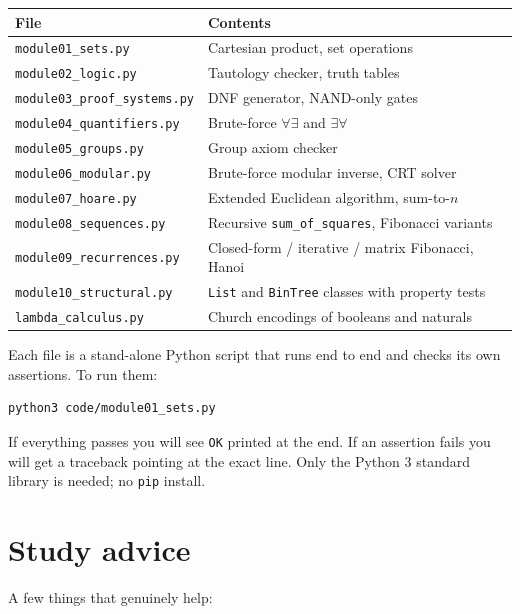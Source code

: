 \documentclass[11pt]{article}
\begin{document}
\begin{center}
\begin{tabular}{l l}
\toprule
\textbf{File} & \textbf{Contents} \\
\midrule
\texttt{module01\_sets.py}           & Cartesian product, set operations \\
\texttt{module02\_logic.py}          & Tautology checker, truth tables \\
\texttt{module03\_proof\_systems.py} & DNF generator, NAND-only gates \\
\texttt{module04\_quantifiers.py}    & Brute-force $\forall\exists$ and $\exists\forall$ \\
\texttt{module05\_groups.py}         & Group axiom checker \\
\texttt{module06\_modular.py}        & Brute-force modular inverse, CRT solver \\
\texttt{module07\_hoare.py}          & Extended Euclidean algorithm, sum-to-$n$ \\
\texttt{module08\_sequences.py}      & Recursive \texttt{sum\_of\_squares}, Fibonacci variants \\
\texttt{module09\_recurrences.py}    & Closed-form / iterative / matrix Fibonacci, Hanoi \\
\texttt{module10\_structural.py}     & \texttt{List} and \texttt{BinTree} classes with property tests \\
\texttt{lambda\_calculus.py}         & Church encodings of booleans and naturals \\
\bottomrule
\end{tabular}
\end{center}

Each file is a stand-alone Python script that runs end to end and checks
its own assertions. To run them:

\begin{lstlisting}
python3 code/module01_sets.py
\end{lstlisting}

If everything passes you will see \texttt{OK} printed at the end. If an
assertion fails you will get a traceback pointing at the exact line.
Only the Python 3 standard library is needed; no \texttt{pip} install.

\section*{Study advice}

A few things that genuinely help:
\end{document}
